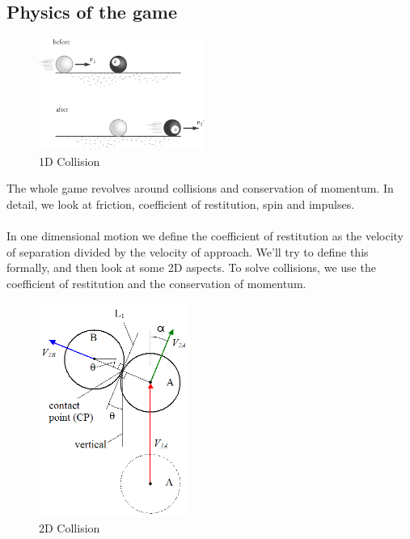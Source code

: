 \documentclass[a4paper,12pt]{article}
\begin{document}
\subsection{Physics of the game}
\begin{figure}
  \begin{center}
    \includegraphics[width=0.48\textwidth]{8ball.png}
  \end{center}
  \caption{1D Collision\cite{1D}} 
\end{figure}
The whole game revolves around collisions and conservation of momentum. In detail, we look at friction, coefficient of restitution, spin and impulses.
\\\\
In one dimensional motion we define the coefficient of restitution as the velocity of separation divided by the velocity of approach. We'll try to define this formally, and then look at some 2D aspects.
\clearpage
To solve collisions, we use the coefficient of restitution and the conservation of momentum.

\begin{figure}
  \begin{center}
    \includegraphics[width=0.44\textwidth]{ball2.png}
  \end{center}
  \vspace{-20pt}
  \caption{2D Collision\cite{2D}}
  \vspace{25pt}
\end{figure}
\end{document}
